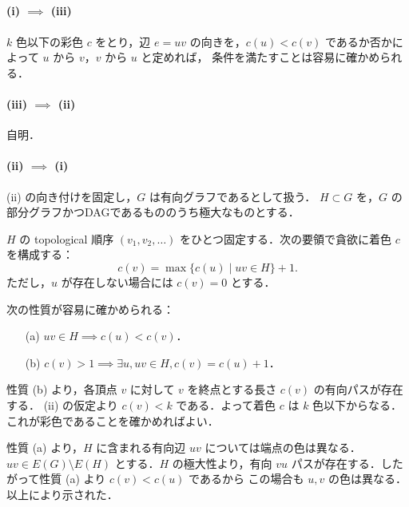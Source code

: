 \subsection{}
\paragraph{(i) $\implies$ (iii)}
$k$ 色以下の彩色 $c$ をとり，辺 $e = uv$ の向きを，$c(u) < c(v)$ であるか否かによって $u$ から $v$，$v$ から $u$ と定めれば，
条件を満たすことは容易に確かめられる．

\paragraph{(iii) $\implies$ (ii)}
自明．

\paragraph{(ii) $\implies$ (i)}
(ii) の向き付けを固定し，$G$ は有向グラフであるとして扱う．
$H\subset G$ を，$G$ の部分グラフかつDAGであるもののうち極大なものとする．

$H$ の topological 順序 $(v_1,v_2,\ldots)$ をひとつ固定する．次の要領で貪欲に着色 $c$ を構成する：
\[
 c(v) = \max\{c(u)\mid uv \in H\} + 1.
\]
ただし，$u$ が存在しない場合には $c(v) = 0$ とする．

次の性質が容易に確かめられる：
\begin{enumerate}
 \item[(a)] $uv\in H\implies c(u) < c(v)$．
 \item[(b)] $c(v) > 1 \implies \exists u, uv\in H, c(v) = c(u) + 1$．
\end{enumerate}

性質 (b) より，各頂点 $v$ に対して $v$ を終点とする長さ $c(v)$ の有向パスが存在する．
(ii) の仮定より $c(v) < k$ である．よって着色 $c$ は $k$ 色以下からなる．これが彩色であることを確かめればよい．

性質 (a) より，$H$ に含まれる有向辺 $uv$ については端点の色は異なる．
$uv\in E(G)\setminus E(H)$ とする．$H$ の極大性より，有向 $vu$ パスが存在する．したがって性質 (a) より $c(v) < c(u)$ であるから
この場合も $u,v$ の色は異なる．
以上により示された．
